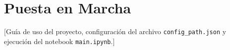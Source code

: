 \chapter{Puesta en Marcha}

[Guía de uso del proyecto, configuración del archivo \texttt{config\_path.json} y ejecución del notebook \texttt{main.ipynb}.]
